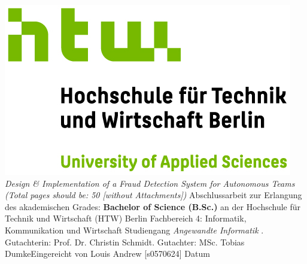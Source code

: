 \documentclass[oneside,bibliography=totocnumbered,BCOR=5mm]{scrbook}%
\theoremstyle{definition}
\theoremstyle{definition}
\theoremstyle{definition}
\theoremstyle{definition}
\theoremstyle{definition}
\theoremstyle{definition}
\begin{document}
\begin{titlepage}
\begin{center}
\includegraphics{images/HTW_Berlin_Logo_farbig.jpg}
\linebreak[4]
\linebreak[4]
\linebreak[4]
\linebreak[4]
\textit{\large Design \& Implementation of a Fraud Detection System for Autonomous Teams (Total pages should be: 50 [without Attachments])}
\linebreak[4]
\linebreak[4]
\linebreak[4]
Abschlussarbeit 
\linebreak[4]
\linebreak[4]
zur Erlangung des akademischen Grades: 
\linebreak[4]
\linebreak[4]
\textbf{Bachelor of Science (B.Sc.)} 
\linebreak[4]
\linebreak[4]
an der
\linebreak[4]
\linebreak[4]
Hochschule f\"ur Technik und Wirtschaft (HTW) Berlin
\linebreak[4]
Fachbereich 4: Informatik, Kommunikation und Wirtschaft
\linebreak[4]
Studiengang \textit{Angewandte Informatik}
\linebreak[4]
\linebreak[4]
. Gutachterin: Prof. Dr. Christin Schmidt. Gutachter: MSc. Tobias Dumke\linebreak[4]
\linebreak[4]
\linebreak[4]
\linebreak[4]
\linebreak[4]
Eingereicht von Louis Andrew [s0570624]
\linebreak[4]
\linebreak[4]
\linebreak[4]
\linebreak[4]
Datum
\linebreak[4]


\end{center}
\end{titlepage}
\end{document}

